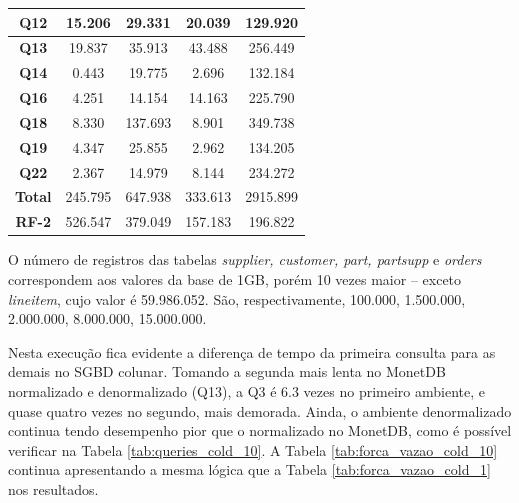 \begin{table}[htpb]
\begin{tabular}{|c|c|c|c|c|}
                 \textbf{Q12}         & 15.206            & 29.331                        & 20.039            & 129.920                   \\ 
                \hline
                 \textbf{Q13}         & 19.837            & 35.913                        & 43.488            & 256.449                   \\ 
                \hline
                 \textbf{Q14}         & 0.443             & 19.775                        & 2.696             & 132.184                   \\ 
                \hline
                 \textbf{Q16}         & 4.251             & 14.154                        & 14.163            & 225.790                   \\ 
                \hline
                 \textbf{Q18}         & 8.330             & 137.693                       & 8.901             & 349.738                   \\ 
                \hline
                 \textbf{Q19}         & 4.347             & 25.855                        & 2.962             & 134.205                   \\ 
                \hline
                 \textbf{Q22}         & 2.367             & 14.979                        & 8.144             & 234.272                   \\ 
                \hline
                 \textbf{Total}       & 245.795           & 647.938                       & 333.613           & 2915.899                  \\ 
                \hline
                 \textbf{RF-2}        & 526.547           & 379.049                       & 157.183           & 196.822                   \\
                \hline
                \end{tabular}
                \end{table}

O número de registros das tabelas \textit{supplier, customer, part, partsupp} e \textit{orders} correspondem aos valores da base de 1GB, porém 10 vezes maior -- exceto \textit{lineitem}, cujo valor é 59.986.052. São, respectivamente, 100.000, 1.500.000, 2.000.000, 8.000.000, 15.000.000.

Nesta execução fica evidente a diferença de tempo da primeira consulta para as demais no SGBD colunar. Tomando a segunda mais lenta no MonetDB normalizado e denormalizado (Q13), a Q3 é 6.3 vezes no primeiro ambiente, e quase quatro vezes no segundo, mais demorada. Ainda, o ambiente denormalizado continua tendo desempenho pior que o normalizado no MonetDB, como é possível verificar na Tabela \ref{tab:queries_cold_10}. A Tabela \ref{tab:forca_vazao_cold_10} continua apresentando a mesma lógica que a Tabela \ref{tab:forca_vazao_cold_1} nos resultados.

